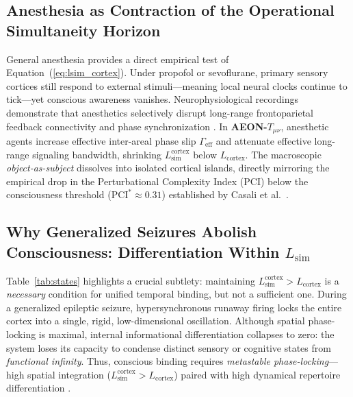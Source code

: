 \documentclass[11pt,a4paper]{article}
\begin{document}
\subsection{Anesthesia as Contraction of the Operational Simultaneity Horizon}
General anesthesia provides a direct empirical test of Equation~(\ref{eq:lsim_cortex}). Under propofol or sevoflurane, primary sensory cortices still respond to external stimuli—meaning local neural clocks continue to tick—yet conscious awareness vanishes. Neurophysiological recordings demonstrate that anesthetics selectively disrupt long-range frontoparietal feedback connectivity and phase synchronization \cite{mashour2020,lee2013}. In \textbf{AEON-$T_{\mu\nu}$}, anesthetic agents increase effective inter-areal phase slip $\Gamma_{\mathrm{eff}}$ and attenuate effective long-range signaling bandwidth, shrinking $L_{\mathrm{sim}}^{\mathrm{cortex}}$ below $L_{\mathrm{cortex}}$. The macroscopic \emph{object-as-subject} dissolves into isolated cortical islands, directly mirroring the empirical drop in the Perturbational Complexity Index (PCI) below the consciousness threshold ($\mathrm{PCI}^* \approx 0.31$) established by Casali et al.\ \cite{casali2013}.

\subsection{Why Generalized Seizures Abolish Consciousness: Differentiation Within $L_{\mathrm{sim}}$}
Table~\ref{tab:states} highlights a crucial subtlety: maintaining $L_{\mathrm{sim}}^{\mathrm{cortex}} > L_{\mathrm{cortex}}$ is a \emph{necessary} condition for unified temporal binding, but not a sufficient one. During a generalized epileptic seizure, hypersynchronous runaway firing locks the entire cortex into a single, rigid, low-dimensional oscillation. Although spatial phase-locking is maximal, internal informational differentiation collapses to zero: the system loses its capacity to condense distinct sensory or cognitive states from \emph{functional infinity}. Thus, conscious binding requires \emph{metastable phase-locking}—high spatial integration ($L_{\mathrm{sim}}^{\mathrm{cortex}} > L_{\mathrm{cortex}}$) paired with high dynamical repertoire differentiation \cite{tononi2016}.
\end{document}
